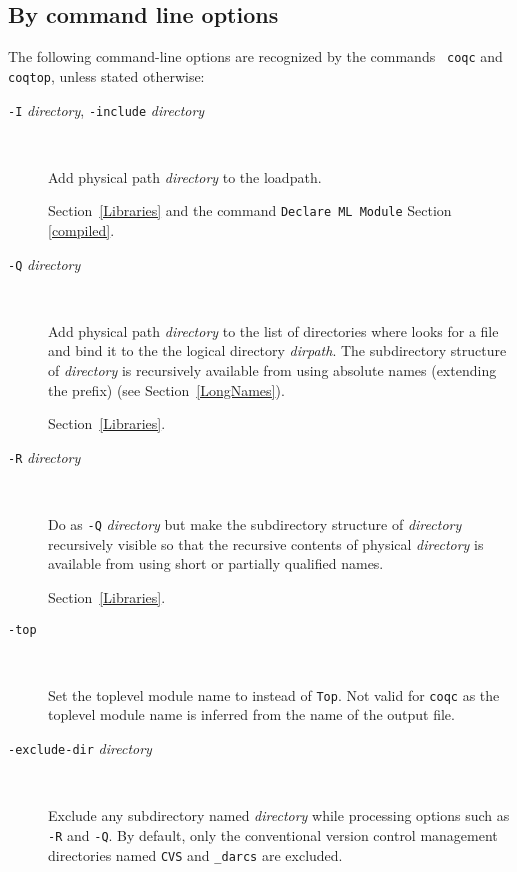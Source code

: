 \subsection{By command line options
\label{coqoptions}}

The following command-line options are recognized by the commands {\tt
  coqc} and {\tt coqtop}, unless stated otherwise:

\begin{description}
\item[{\tt -I} {\em directory}, {\tt -include} {\em directory}]\ %

  Add physical path {\em directory} to the {\ocaml} loadpath.

  \SeeAlso Section~\ref{Libraries} and the command {\tt Declare ML Module} Section \ref{compiled}.

\item[{\tt -Q} {\em directory} {\dirpath}]\ %

  Add physical path \emph{directory} to the list of directories where
  {\Coq} looks for a file and bind it to the the logical directory
  \emph{dirpath}. The subdirectory structure of \emph{directory} is
  recursively available from {\Coq} using absolute names (extending
  the {\dirpath} prefix) (see Section~\ref{LongNames}).

  \SeeAlso Section~\ref{Libraries}.

\item[{\tt -R} {\em directory} {\dirpath}]\ %

  Do as \texttt{-Q} \emph{directory} {\dirpath} but make the
  subdirectory structure of \emph{directory} recursively visible so
  that the recursive contents of physical \emph{directory} is available
  from {\Coq} using short or partially qualified names.

  \SeeAlso Section~\ref{Libraries}.

\item[{\tt -top} {\dirpath}]\ %

  Set the toplevel module name to {\dirpath} instead of {\tt Top}. Not
  valid for {\tt coqc} as the toplevel module name is inferred from the
  name of the output file.

\item[{\tt -exclude-dir} {\em directory}]\ %

  Exclude any subdirectory named {\em directory} while
  processing options such as {\tt -R} and {\tt -Q}. By default, only the
  conventional version control management directories named {\tt CVS} and
  {\tt \_darcs} are excluded.


\end{description}
